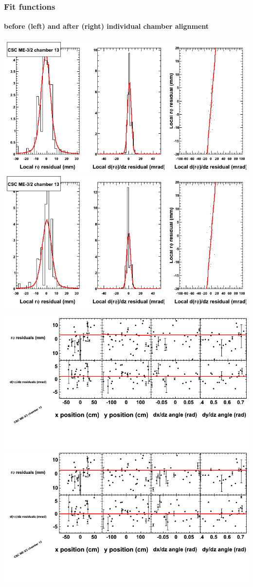 \documentclass[compress]{beamer}
\begin{document}
\begin{frame}
\frametitle{Fit functions}
\framesubtitle{before (left) and after (right) individual chamber alignment}
\includegraphics[width=0.5\linewidth]{ringfits_3dof/beforefit_MEm32_13_bellcurve.png} \includegraphics[width=0.5\linewidth]{ringfits_3dof/afterfit_MEm32_13_bellcurve.png}

\includegraphics[width=0.5\linewidth]{ringfits_3dof/beforefit_MEm32_13_polynomials.png} \includegraphics[width=0.5\linewidth]{ringfits_3dof/afterfit_MEm32_13_polynomials.png}
\end{frame}
\end{document}
